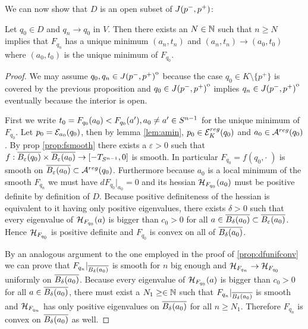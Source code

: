 We can now show that $D$ is an open subset of $J(p^-,p^+)$:
\begin{proposition}\label{prop:globalminconv}
    Let $q_0\in D$ and $q_n\to q_0$ in $V$. Then there exists an $N\in \mathbb{N}$ such that $n\ge N$ implies that $F_{q_n}$ has a unique minimum $(a_n,t_n)$ and $(a_n,t_n)\to (a_0,t_0)$ where $(a_0,t_0)$ is the unique minimum of $F_{q_0}$.
\end{proposition}
\begin{proof}
    We may assume $q_0,q_n \in {\kern0ptJ(p^-,p^+)}^{\mathrm{o}}$ because the case $q_0\in K\setminus\{p^+\}$ is covered by the previous proposition and $q_0\in {\kern0ptJ(p^-,p^+)}^{\mathrm{o}}$ implies $q_n\in {\kern0ptJ(p^-,p^+)}^{\mathrm{o}}$ eventually because the interior is open.

    First we write $t_0=F_{q_0}(a_0)<F_{q_0}(a'), a_0\neq a'\in {S^{n-1}}$ for the unique minimum of $F_{q_0}$. Let $p_0 = {\mathcal{E}}_{a_0}(q_0)$, then by lemma \ref{lem:amin}, $p_0\in {{\mathcal{E}}^{reg}_K}(q_0)$ and $a_0\in {{\mathcal{A}}^{reg}}(q_0)$. By prop \ref{prop:fsmooth} there exists a $\varepsilon>0$ such that $f:{\overline{B_\varepsilon(q_0)}}\times{\overline{B_\varepsilon(a_0)}}\to [-T_{S^{n-1}},0]$ is smooth. In particular $F_{q_0}=f(q_0,\cdot\;)$ is smooth on ${\overline{B_\varepsilon(a_0)}}\subset {{\mathcal{A}}^{reg}}(q_0)$. Furthermore because $a_0$ is a local minimum of the smooth $F_{q_n}$ we must have $dF_{q_0}\rvert_{a_0}=0$ and its hessian ${\mathcal{H}}_{F_{q_0}}(a_0)$ must be positive definite by definition of $D$. Because positive definiteness of the hessian is equivalent to it having only positive eigenvalues, there exists $\delta>0$ such that every eigenvalue of ${\mathcal{H}}_{F_{q_0}}(a)$ is bigger than $c_0>0$ for all $a\in {\overline{B_\delta(a_0)}}\subset {\overline{B_\varepsilon(a_0)}}$. Hence ${\mathcal{H}}_{F_{q_0}}$ is positive definite and $F_{q_0}$ is convex on all of ${\overline{B_\delta(a_0)}}$.

    By an analogous argument to the one employed in the proof of \ref{prop:dfunifconv} we can prove that $F_{q_n}\rvert_{{\overline{B_\delta(a_0)}}}$ is smooth for $n$ big enough and ${\mathcal{H}}_{F_{q_n}}\to {\mathcal{H}}_{F_{q_0}}$ uniformly on ${\overline{B_\delta(a_0)}}$. Because every eigenvalue of ${\mathcal{H}}_{F_{q_0}}(a)$ is bigger than $c_0>0$ for all $a\in {\overline{B_\delta(a_0)}}$, there must exist a $N_1\ge \in \mathbb{N}$ such that $F_{q_n}\rvert_{{\overline{B_\delta(a_0)}}}$ is smooth and ${\mathcal{H}}_{F_{q_n}}$ has only positive eigenvalues on ${\overline{B_\delta(a_0)}}$ for all $n \ge N_1$. Therefore $F_{q_n}$ is convex on ${\overline{B_\delta(a_0)}}$ as well.
    

\end{proof}
